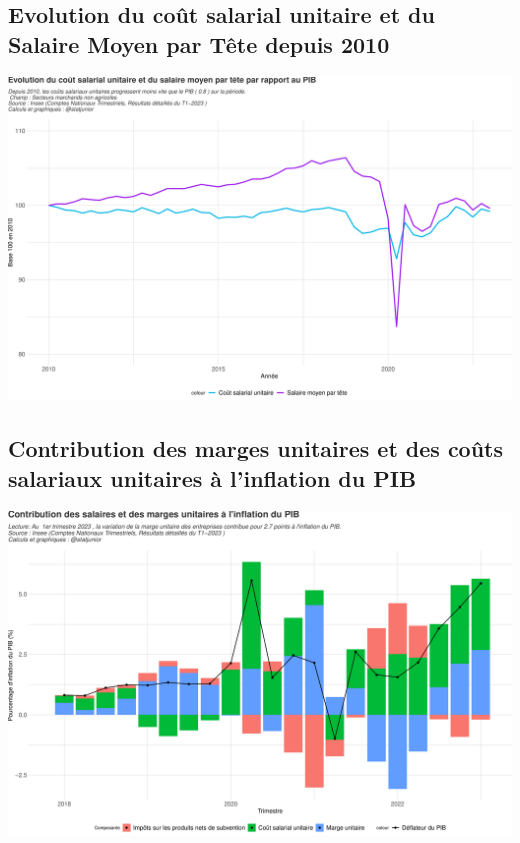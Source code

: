 \documentclass[
  paper=a4,
  ,captions=tableheading
]{scrartcl}
\begin{document}
\hypertarget{evolution-du-couxfbt-salarial-unitaire-et-du-salaire-moyen-par-tuxeate-depuis-2010}{%
\subsection{Evolution du coût salarial unitaire et du Salaire Moyen par
Tête depuis
2010}\label{evolution-du-couxfbt-salarial-unitaire-et-du-salaire-moyen-par-tuxeate-depuis-2010}}

\includegraphics{rapport_pdf_compte_branche_files/figure-latex/unnamed-chunk-42-1.pdf}

\hypertarget{contribution-des-marges-unitaires-et-des-couxfbts-salariaux-unitaires-uxe0-linflation-du-pib}{%
\subsection{Contribution des marges unitaires et des coûts salariaux
unitaires à l'inflation du
PIB}\label{contribution-des-marges-unitaires-et-des-couxfbts-salariaux-unitaires-uxe0-linflation-du-pib}}

\includegraphics{rapport_pdf_compte_branche_files/figure-latex/unnamed-chunk-45-1.pdf}
\end{document}
